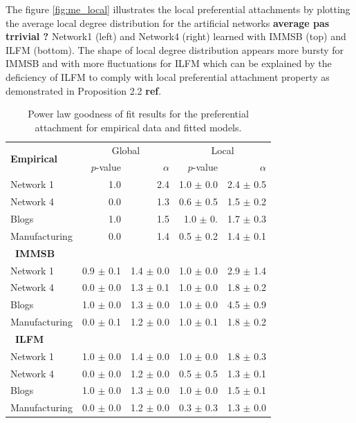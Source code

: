 The figure \ref{fig:me_local} illustrates the local preferential attachments by plotting the average local degree distribution for the artificial networks \textbf{average pas trrivial ?}  Network1 (left) and Network4 (right) learned with IMMSB (top) and ILFM (bottom). The shape of local degree distribution appears more bursty for IMMSB and with more fluctuations for ILFM which can be explained by the deficiency of ILFM to comply with local preferential attachment property as demonstrated in Proposition 2.2 \textbf{ref}.
 
 

\begin{table}[t]
    \caption{Power law goodness of fit results for the preferential attachment for empirical data and fitted models.}
\centering
  \begin{tabular}{lrrrr}
      \multirow{2}{*}{\textbf{Empirical}}  &
      \multicolumn{2}{c}{Global} & \multicolumn{2}{c}{Local}\\
      \cmidrule(r){2-3} \cmidrule(l){4-5}
      &   $p$-value &   $\alpha$   & $p$-value & $\alpha$   \\
  	\hline
    Network 1     &    1.0 &   2.4 & 1.0 $\pm$ 0.0  &  2.4 $\pm$ 0.5  \\
    Network 4     &    0.0 &   1.3 & 0.6 $\pm$ 0.5  &  1.5 $\pm$ 0.2 \\
    Blogs         &    1.0 &   1.5 & 1.0 $\pm$ 0.   &  1.7 $\pm$ 0.3 \\
    Manufacturing &    0.0 &   1.4 & 0.5 $\pm$ 0.2  &  1.4 $\pm$ 0.1 \\
  	\hline

      \ \textbf{IMMSB} &&&& \\
  	\hline
    Network 1     & 0.9 \(\pm\) 0.1   & 1.4 \(\pm\) 0.0 & 1.0 \(\pm\) 0.0   & 2.9 \(\pm\) 1.4 \\
    Network 4     & 0.0 \(\pm\) 0.0   & 1.3 \(\pm\) 0.1 & 1.0 \(\pm\) 0.0   & 1.8 \(\pm\) 0.2 \\
    Blogs         & 1.0 \(\pm\) 0.0   & 1.3 \(\pm\) 0.0 & 1.0 \(\pm\) 0.0   & 4.5 \(\pm\) 0.9 \\
    Manufacturing & 0.0 \(\pm\) 0.1   & 1.2 \(\pm\) 0.0 & 1.0 \(\pm\) 0.1   & 1.8 \(\pm\) 0.2 \\
  	\hline

      \ \textbf{ILFM} &&&& \\
  	\hline
    Network 1     & 1.0 \(\pm\) 0.0 & 1.4 \(\pm\) 0.0 & 1.0 \(\pm\) 0.0 & 1.8 \(\pm\) 0.3 \\
    Network 4     & 0.0 \(\pm\) 0.0 & 1.2 \(\pm\) 0.0 & 0.5 \(\pm\) 0.5 & 1.3 \(\pm\) 0.1 \\
    Blogs         & 1.0 \(\pm\) 0.0 & 1.3 \(\pm\) 0.0 & 1.0 \(\pm\) 0.0 & 1.5 \(\pm\) 0.1 \\
    Manufacturing & 0.0 \(\pm\) 0.0 & 1.2 \(\pm\) 0.0 & 0.3 \(\pm\) 0.3 & 1.3 \(\pm\) 0.0 \\
  	\hline
  \end{tabular}
\label{table:me_gofit}
\end{table}

